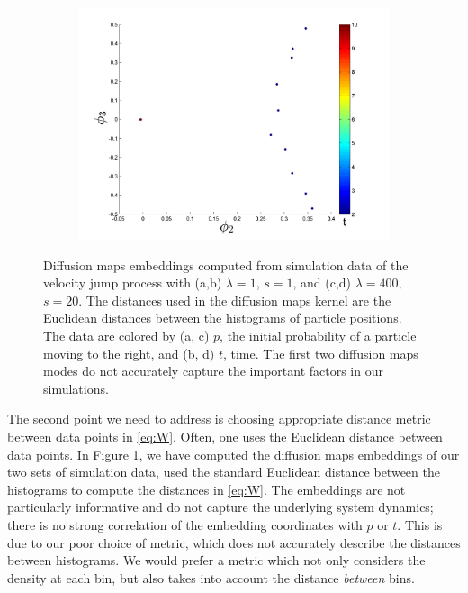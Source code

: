 \documentclass[prl, reprint, final, showkeys]{revtex4-1}
\begin{document}
\begin{figure}[t]
\begin{subfigure}{0.2\textwidth}
\caption{}
\end{subfigure}
\begin{subfigure}{0.2\textwidth}
\includegraphics[width=\textwidth]{rawhist_t_400}
\caption{}
\end{subfigure}
\caption{Diffusion maps embeddings computed from simulation data of the velocity jump process with (a,b) $\lambda=1$, $s=1$, and (c,d) $\lambda=400$, $s=20$. The distances used in the diffusion maps kernel are the Euclidean distances between the histograms of particle positions. The data are colored by (a, c) $p$, the initial probability of a particle moving to the right, and (b, d) $t$, time. The first two diffusion maps modes do not accurately capture the important factors in our simulations.}
\label{fig:dmaps_embed_noemd}
\end{figure}

The second point we need to address is choosing appropriate distance metric between data points in \eqref{eq:W}.
%
Often, one uses the Euclidean distance between data points.
%
In Figure \ref{fig:dmaps_embed_noemd}, we have computed the diffusion maps embeddings of our two sets of simulation data, used the standard Euclidean distance between the histograms to compute the distances in \eqref{eq:W}.
%
The embeddings are not particularly informative and do not capture the underlying system dynamics; there is no strong correlation of the embedding coordinates with $p$ or $t$. 
%
This is due to our poor choice of metric, which does not accurately describe the distances between histograms.
%
We would prefer a metric which not only considers the density at each bin, but also takes into account the distance {\em between} bins.
%
%
\end{document}
